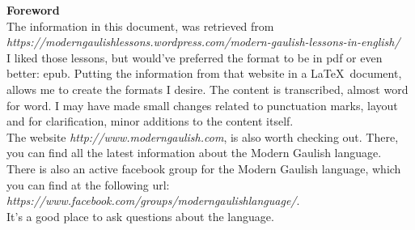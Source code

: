 \begin{center}
\textbf{Foreword}\\
\bigskip
The information in this document, was retrieved from \textit{https://moderngaulishlessons.wordpress.com/modern-gaulish-lessons-in-english/}\\
\bigskip
I liked those lessons, but would've preferred the format to be in pdf or even better: epub. Putting the information from that website in a \LaTeX\ document, allows me to create the formats I desire. The content is transcribed, almost word for word. I may have made small changes related to punctuation marks, layout and for clarification, minor additions to the content itself.\\
\bigskip
The website \textit{http://www.moderngaulish.com}, is also worth checking out. There, you can find all the latest information about the Modern Gaulish language.\\
\bigskip
There is also an active facebook group for the Modern Gaulish language, which you can find at the following url: \textit{https://www.facebook.com/groups/moderngaulishlanguage/}.\\It's a good place to ask questions about the language.
\end{center}
